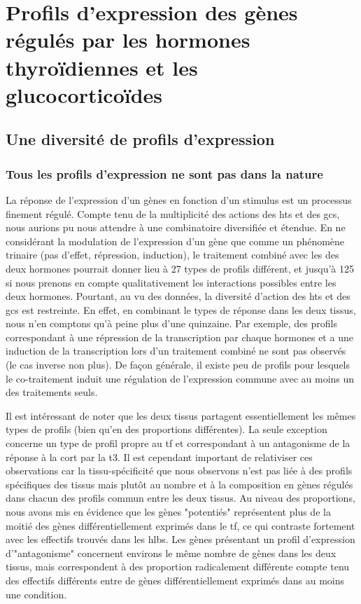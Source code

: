 \documentclass[../main.tex]{subfiles}
\begin{document}
\chapter{Profils d'expression des gènes régulés par les hormones thyroïdiennes et les glucocorticoïdes}


\section{Une diversité de profils d'expression}

\subsection{Tous les profils d'expression ne sont pas dans la nature}
La réponse de l'expression d'un gènes en fonction d'un stimulus est un processus finement régulé.
Compte tenu de la multiplicité des actions des \glspl{ht} et des \glspl{gc}, nous aurions pu nous attendre à une combinatoire diversifiée et étendue.
En ne considérant la modulation de l'expression d'un gène que comme un phénomène trinaire (pas d'effet, répression, induction), le traitement combiné avec les des deux hormones pourrait donner lieu à 27 types de profils différent, et jusqu'à 125 si nous prenons en compte qualitativement les interactions possibles entre les deux hormones.
Pourtant, au vu des données, la diversité d'action des \glspl{ht} et des \glspl{gc} est restreinte.
En effet, en combinant le types de réponse dans les deux tissus, nous n'en comptons qu'à peine plus d'une quinzaine.
Par exemple, des profils correspondant à une répression de la transcription par chaque hormones et a une induction de la transcription lors d'un traitement combiné ne sont pas observés (le cas inverse non plus).
De façon générale, il existe peu de profils pour lesquels le co-traitement induit une régulation de l'expression commune avec au moins un des traitements seuls.
\par
Il est intéressant de noter que les deux tissus partagent essentiellement les mêmes types de profils (bien qu'en des proportions différentes).
La seule exception concerne un type de profil propre au \gls{tf} et correspondant à un antagonisme de la réponse à la \gls{cort} par la \gls{t3}.
Il est cependant important de relativiser ces observations car la tissu-spécificité que nous observons n'est pas liée à des profils spécifiques des tissus mais plutôt au nombre et à la composition en gènes régulés dans chacun des profils commun entre les deux tissus.
Au niveau des proportions, nous avons mis en évidence que les gènes "potentiés" représentent plus de la moitié des gènes différentiellement exprimés dans le \gls{tf}, ce qui contraste fortement avec les effectifs trouvés dans les \glspl{hlb}.
Les gènes présentant un profil d'expression d'"antagonisme" concernent environs le même nombre de gènes dans les deux tissus, mais correspondent à des proportion radicalement différente compte tenu des effectifs différents entre de gènes différentiellement exprimés dans au moins une condition.
\end{document}

